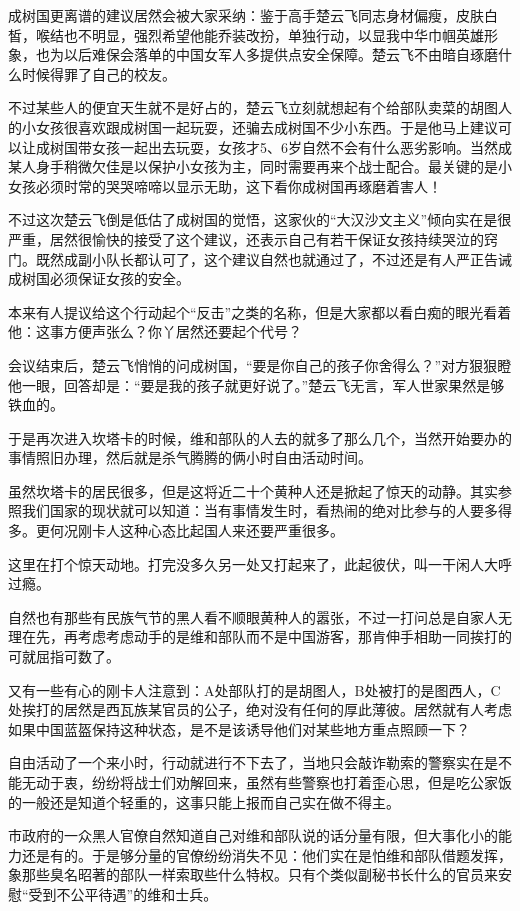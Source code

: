 成树国更离谱的建议居然会被大家采纳：鉴于高手楚云飞同志身材偏瘦，皮肤白皙，喉结也不明显，强烈希望他能乔装改扮，单独行动，以显我中华巾帼英雄形象，也为以后难保会落单的中国女军人多提供点安全保障。楚云飞不由暗自琢磨什么时候得罪了自己的校友。

不过某些人的便宜天生就不是好占的，楚云飞立刻就想起有个给部队卖菜的胡图人的小女孩很喜欢跟成树国一起玩耍，还骗去成树国不少小东西。于是他马上建议可以让成树国带女孩一起出去玩耍，女孩才5、6岁自然不会有什么恶劣影响。当然成某人身手稍微欠佳是以保护小女孩为主，同时需要再来个战士配合。最关键的是小女孩必须时常的哭哭啼啼以显示无助，这下看你成树国再琢磨着害人！

不过这次楚云飞倒是低估了成树国的觉悟，这家伙的“大汉沙文主义”倾向实在是很严重，居然很愉快的接受了这个建议，还表示自己有若干保证女孩持续哭泣的窍门。既然成副小队长都认可了，这个建议自然也就通过了，不过还是有人严正告诫成树国必须保证女孩的安全。

本来有人提议给这个行动起个“反击”之类的名称，但是大家都以看白痴的眼光看着他：这事方便声张么？你丫居然还要起个代号？

会议结束后，楚云飞悄悄的问成树国，“要是你自己的孩子你舍得么？”对方狠狠瞪他一眼，回答却是：“要是我的孩子就更好说了。”楚云飞无言，军人世家果然是够铁血的。

于是再次进入坎塔卡的时候，维和部队的人去的就多了那么几个，当然开始要办的事情照旧办理，然后就是杀气腾腾的俩小时自由活动时间。

虽然坎塔卡的居民很多，但是这将近二十个黄种人还是掀起了惊天的动静。其实参照我们国家的现状就可以知道：当有事情发生时，看热闹的绝对比参与的人要多得多。更何况刚卡人这种心态比起国人来还要严重很多。

这里在打个惊天动地。打完没多久另一处又打起来了，此起彼伏，叫一干闲人大呼过瘾。

自然也有那些有民族气节的黑人看不顺眼黄种人的嚣张，不过一打问总是自家人无理在先，再考虑考虑动手的是维和部队而不是中国游客，那肯伸手相助一同挨打的可就屈指可数了。

又有一些有心的刚卡人注意到：A处部队打的是胡图人，B处被打的是图西人，C处挨打的居然是西瓦族某官员的公子，绝对没有任何的厚此薄彼。居然就有人考虑如果中国蓝盔保持这种状态，是不是该诱导他们对某些地方重点照顾一下？

自由活动了一个来小时，行动就进行不下去了，当地只会敲诈勒索的警察实在是不能无动于衷，纷纷将战士们劝解回来，虽然有些警察也打着歪心思，但是吃公家饭的一般还是知道个轻重的，这事只能上报而自己实在做不得主。

市政府的一众黑人官僚自然知道自己对维和部队说的话分量有限，但大事化小的能力还是有的。于是够分量的官僚纷纷消失不见：他们实在是怕维和部队借题发挥，象那些臭名昭著的部队一样索取些什么特权。只有个类似副秘书长什么的官员来安慰“受到不公平待遇”的维和士兵。

